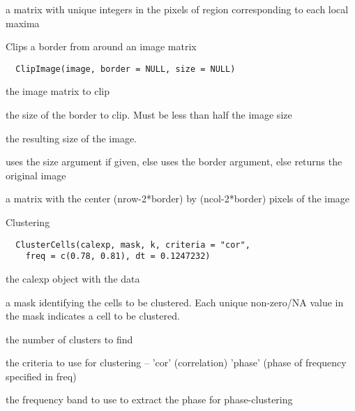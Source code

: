 \documentclass[a4paper]{book}
\begin{document}
%
\begin{Value}
a matrix with unique integers in the pixels of region
corresponding to each local maxima
\end{Value}
%
\begin{Description}\relax
Clips a border from around an image matrix
\end{Description}
%
\begin{Usage}
\begin{verbatim}
  ClipImage(image, border = NULL, size = NULL)
\end{verbatim}
\end{Usage}
%
\begin{Arguments}
\begin{ldescription}
\item[\code{image}] the image matrix to clip

\item[\code{border}] the size of the border to clip.  Must be
less than half the image size

\item[\code{size}] the resulting size of the image.
\end{ldescription}
\end{Arguments}
%
\begin{Details}\relax
uses the size argument if given, else uses the border
argument, else returns the original image
\end{Details}
%
\begin{Value}
a matrix with the center (nrow-2*border) by
(ncol-2*border) pixels of the image
\end{Value}
%
\begin{Description}\relax
Clustering
\end{Description}
%
\begin{Usage}
\begin{verbatim}
  ClusterCells(calexp, mask, k, criteria = "cor",
    freq = c(0.78, 0.81), dt = 0.1247232)
\end{verbatim}
\end{Usage}
%
\begin{Arguments}
\begin{ldescription}
\item[\code{calexp}] the calexp object with the data

\item[\code{mask}] a mask identifying the cells to be clustered.
Each unique non-zero/NA value in the mask indicates a
cell to be clustered.

\item[\code{k}] the number of clusters to find

\item[\code{criteria}] the criteria to use for clustering --
'cor' (correlation) 'phase' (phase of frequency specified
in freq)

\item[\code{freq}] the frequency band to use to extract the
phase for phase-clustering
\end{ldescription}
\end{Arguments}
\end{document}
